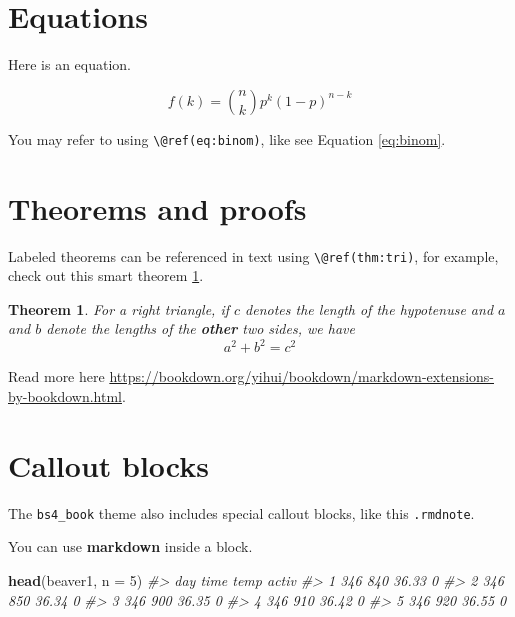 \documentclass[
]{book}
\newenvironment{Shaded}{\begin{snugshade}}{\end{snugshade}}
\newcommand{\AttributeTok}[1]{\textcolor[rgb]{0.13,0.29,0.53}{#1}}
\newcommand{\CommentTok}[1]{\textcolor[rgb]{0.56,0.35,0.01}{\textit{#1}}}
\newcommand{\DecValTok}[1]{\textcolor[rgb]{0.00,0.00,0.81}{#1}}
\newcommand{\FunctionTok}[1]{\textcolor[rgb]{0.13,0.29,0.53}{\textbf{#1}}}
\newcommand{\NormalTok}[1]{#1}
\newtheorem{theorem}{Theorem}[chapter]
\theoremstyle{definition}
\theoremstyle{definition}
\theoremstyle{definition}
\theoremstyle{definition}
\theoremstyle{remark}
\begin{document}
\hypertarget{equations}{%
\section{Equations}\label{equations}}

Here is an equation.

\begin{equation} 
  f\left(k\right) = \binom{n}{k} p^k\left(1-p\right)^{n-k}
  \label{eq:binom}
\end{equation}

You may refer to using \texttt{\textbackslash{}@ref(eq:binom)}, like see Equation \eqref{eq:binom}.

\hypertarget{theorems-and-proofs}{%
\section{Theorems and proofs}\label{theorems-and-proofs}}

Labeled theorems can be referenced in text using \texttt{\textbackslash{}@ref(thm:tri)}, for example, check out this smart theorem \ref{thm:tri}.

\begin{theorem}
\protect\hypertarget{thm:tri}{}\label{thm:tri}For a right triangle, if \(c\) denotes the \emph{length} of the hypotenuse
and \(a\) and \(b\) denote the lengths of the \textbf{other} two sides, we have
\[a^2 + b^2 = c^2\]
\end{theorem}

Read more here \url{https://bookdown.org/yihui/bookdown/markdown-extensions-by-bookdown.html}.

\hypertarget{callout-blocks}{%
\section{Callout blocks}\label{callout-blocks}}

The \texttt{bs4\_book} theme also includes special callout blocks, like this \texttt{.rmdnote}.

You can use \textbf{markdown} inside a block.

\begin{Shaded}
\begin{Highlighting}[]
\FunctionTok{head}\NormalTok{(beaver1, }\AttributeTok{n =} \DecValTok{5}\NormalTok{)}
\CommentTok{\#\textgreater{}   day time  temp activ}
\CommentTok{\#\textgreater{} 1 346  840 36.33     0}
\CommentTok{\#\textgreater{} 2 346  850 36.34     0}
\CommentTok{\#\textgreater{} 3 346  900 36.35     0}
\CommentTok{\#\textgreater{} 4 346  910 36.42     0}
\CommentTok{\#\textgreater{} 5 346  920 36.55     0}
\end{Highlighting}
\end{Shaded}
\end{document}
